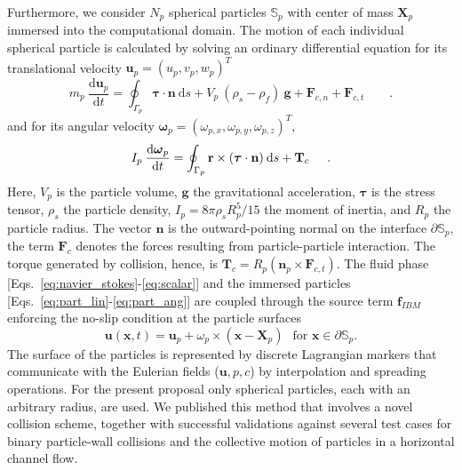 \documentclass[10pt]{article}
\begin{document}
Furthermore, we consider $N_p$ spherical particles $\mathbb S_p$ with center of mass $\mathbf X_p$ immersed into the computational domain. The motion of each individual spherical particle is calculated by solving an ordinary differential equation for its
translational velocity $\textbf{u}_p=(u_p,v_p,w_p)^{T}$
%     
       \begin{equation}\label{eq:part_lin}
        m_p\: \frac{\text{d}\textbf{u}_p}{\text{d} t} = \oint_{\Gamma_p} \boldsymbol{\tau} \cdot \textbf{n}\: \text{d}s + 
       V_p\:( \rho_s-\rho_f )\: \textbf{g} + \textbf{F}_{c,n} + \textbf{F}_{c,t} \qquad .
       \end{equation}     
        and for its angular velocity $\boldsymbol{\omega}_p=(\omega_{p,x},\omega_{p,y},\omega_{p,z})^{T}$,
       \begin{equation}\label{eq:part_ang}
       I_p \:\frac{ \text{d}\boldsymbol{\omega}_p}{\text{d} t} = \oint_{\Gamma_p} \textbf{r}\times(\boldsymbol{\tau}\cdot\textbf{n})\:\text{d}s + \textbf{T}_c \hspace{0.5cm}.
      \end{equation} 
Here, $V_p$ is the particle volume, $\textbf{g}$ the gravitational acceleration, $\boldsymbol{\tau}$ is the stress tensor, $\rho_s$ the particle density,
$I_p=8\pi\rho_s R_p^{5}/15$ the moment of inertia, and $R_p$ the particle radius. 
The vector $\textbf{n}$ is the outward-pointing normal on the
interface $\partial \mathbb S_p$, the term $\textbf{F}_c$ denotes the forces resulting from particle-particle
interaction. The torque generated by collision, hence, is $\textbf{T}_c= R_p \left( \textbf{n}_p \times \textbf{F}_{c,t} \right)$.
The fluid phase [Eqs.~\eqref{eq:navier_stokes}-\eqref{eq:scalar}] and the immersed particles [Eqs.~\eqref{eq:part_lin}-\eqref{eq:part_ang}] are coupled through the source term $\textbf{f}_{IBM}$ enforcing the no-slip  condition at the particle surfaces
\begin{equation}
\mathbf u(\mathbf x,t) =  \mathbf u_p + \omega_p \times  ( \mathbf x-\mathbf X_p)\  \,\text{ for } \mathbf x\in \partial \mathbb S_p.
\end{equation}
The surface of the particles is represented by discrete Lagrangian markers that communicate with the Eulerian fields ($\mathbf u,p,c$) by interpolation and spreading operations. For the present proposal only spherical particles, each with an arbitrary radius, are used. We published \citep{biegert2016} this method that involves a novel collision scheme, together with  successful validations against several test cases for binary particle-wall collisions and the collective motion of particles in a horizontal channel flow.
\end{document}
